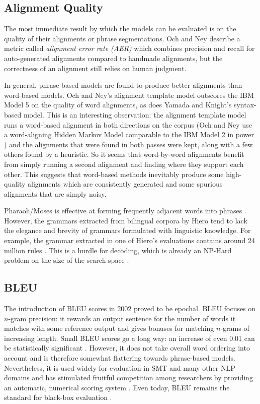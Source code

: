 \documentclass[11pt]{article}
\begin{document}
\subsection{Alignment Quality}
The most immediate result by which the models can be evaluated is on the quality of their alignments or
phrase segmentations. Och and Ney \cite{och:00} describe a metric 
called \textit{alignment error rate (AER)} which combines precision and recall for auto-generated alignments
compared to handmade alignments, but the correctness of an alignment still relies on human judgment.

In general, phrase-based models are found to produce better alignments than word-based models.
Och and Ney's alignment template model outscores the IBM Model 5 on the quality of word alignments,
as does Yamada and Knight's syntax-based model.
This is an interesting observation: the alignment template model runs a word-based alignment
in both directions on the corpus (Och and Ney use a word-aligning Hidden Markov Model
comparable to the IBM Model 2 in power \cite{och:99, hmm}) and the alignments that were found in both passes
were kept, along with a few others found by a heuristic. So it seems that word-by-word
alignments benefit from simply running a second alignment and finding where they support each other.
This suggests that word-based methods inevitably produce some high-quality alignments which are consistently
generated and some spurious alignments that are simply noisy.

Pharaoh/Moses is effective at forming frequently adjacent words into phrases \cite{chiang:05}.
However, the grammars extracted from bilingual corpora by Hiero tend to lack the elegance and 
brevity of grammars formulated with linguistic knowledge. For example, the grammar extracted
in one of Hiero's evaluations contains around 24 million rules \cite{chiang:05}. 
This is a hurdle for decoding, which is already an NP-Hard problem on the size of the search space \cite{knight:99}.

\subsection{BLEU} \label{food-chain}
The introduction of BLEU \cite{bleu} scores in 2002 proved to be epochal. BLEU focuses on $n$-gram precision:
it rewards an output sentence for the number of words it matches with some reference output
and gives bonuses for matching $n$-grams of increasing length. 
Small BLEU scores go a long way: an increase of even 0.01 can be statistically significant \cite{koehn:03, chiang:05}.
However, it does not take overall word ordering into account and is therefore somewhat flattering towards phrase-based models.
Nevertheless, it is used widely for evaluation in SMT and many other NLP domains and 
has stimulated fruitful competition among researchers by providing an automatic, numerical scoring system \cite{lopez}.
Even today, BLEU remains the standard for black-box evaluation \cite{neural-nets}.
\end{document}
